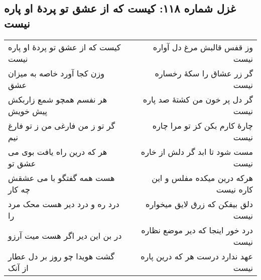 \begin{center}
\section*{غزل شماره ۱۱۸: کیست که از عشق تو پردهٔ او پاره نیست}
\label{sec:118}
\begin{longtable}{l p{0.5cm} r}
کیست که از عشق تو پردهٔ او پاره نیست
&&
وز قفس قالبش مرغ دل آواره نیست
\\
وزن کجا آورد خاصه به میزان عشق
&&
گر زر عشاق را سکهٔ رخساره نیست
\\
هر نفسم همچو شمع زاربکش پیش خویش
&&
گر دل پر خون من کشتهٔ صد پاره نیست
\\
گر تو ز من فارغی من ز تو فارغ نیم
&&
چارهٔ کارم بکن کز تو مرا چاره نیست
\\
هر که درین راه یافت بوی می عشق تو
&&
مست شود تا ابد گر دلش از خاره نیست
\\
هست همه گفتگو با می عشقش چه کار
&&
هرکه درین میکده مفلس و این کاره نیست
\\
درد ره و درد دیر هست محک مرد را
&&
دلق بیفکن که زرق لایق میخواره نیست
\\
در بن این دیر اگر هست میت آرزو
&&
درد خور اینجا که دیر موضع نظاره نیست
\\
گشت هویدا چو روز بر دل عطار از آنک
&&
عهد ندارد درست هر که درین پاره نیست
\\
\end{longtable}
\end{center}
